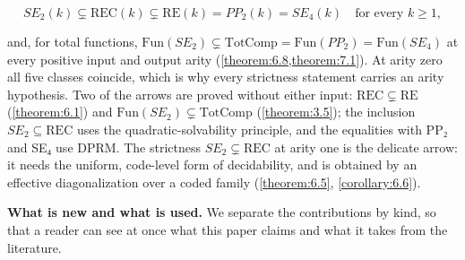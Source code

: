 \documentclass[11pt]{article}
\theoremstyle{plain}
\theoremstyle{definition}
\theoremstyle{remark}
\theoremstyle{plain}
\theoremstyle{definition}
\theoremstyle{remark}
\theoremstyle{plain}
\theoremstyle{definition}
\theoremstyle{remark}
\begin{document}
\[
SE_{2}(k) ⊊ \mathrm{REC}(k) ⊊ \mathrm{RE}(k) = PP_{2}(k) = SE_{4}(k) \quad\text{for every } k ≥ 1,
\]

and, for total functions, $\mathrm{Fun}(SE_{2}) ⊊ \mathrm{TotComp} = \mathrm{Fun}(PP_{2}) = \mathrm{Fun}(SE_{4})$ at every positive input and output arity (\cref{theorem:6.8,theorem:7.1}). At arity zero all five classes coincide, which is why every strictness statement carries an arity hypothesis. Two of the arrows are proved without either input: $\mathrm{REC} ⊊ \mathrm{RE}$ (\cref{theorem:6.1}) and $\mathrm{Fun}(SE_{2}) ⊊ \mathrm{TotComp}$ (\cref{theorem:3.5}); the inclusion $SE_{2} ⊆ \mathrm{REC}$ uses the quadratic-solvability principle, and the equalities with PP₂ and SE₄ use DPRM. The strictness $SE_{2} ⊊ \mathrm{REC}$ at arity one is the delicate arrow: it needs the uniform, code-level form of decidability, and is obtained by an effective diagonalization over a coded family (\cref{theorem:6.5}, \cref{corollary:6.6}).

\textbf{What is new and what is used.} We separate the contributions by kind, so that a reader can see at once what this paper claims and what it takes from the literature.
\end{document}
